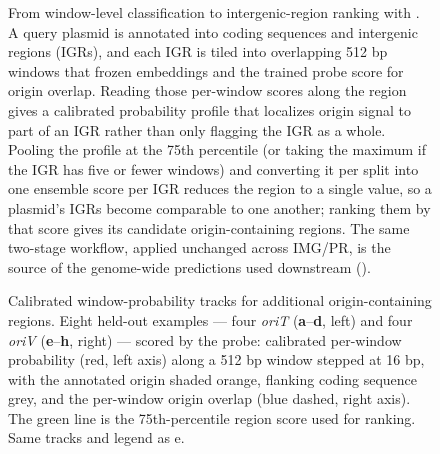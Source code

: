 %
\begin{figure}[h]
    \centering
\caption{
From window-level classification to intergenic-region ranking with \model. A query plasmid is annotated into coding sequences and intergenic regions (IGRs), and each IGR is tiled into overlapping 512 bp windows that frozen \model embeddings and the trained probe score for origin overlap. Reading those per-window scores along the region gives a calibrated probability profile that localizes origin signal to part of an IGR rather than only flagging the IGR as a whole. Pooling the profile at the 75th percentile (or taking the maximum if the IGR has five or fewer windows) and converting it per split into one ensemble score per IGR reduces the region to a single value, so a plasmid's IGRs become comparable to one another; ranking them by that score gives its candidate origin-containing regions. The same two-stage workflow, applied unchanged across IMG/PR, is the source of the genome-wide predictions used downstream ().
}
\label{fig:ed-pipeline}
\end{figure}

\begin{figure}[h]
    \centering
\caption{
Calibrated window-probability tracks for additional origin-containing regions. Eight held-out examples --- four \emph{oriT} (\textbf{a}--\textbf{d}, left) and four \emph{oriV} (\textbf{e}--\textbf{h}, right) --- scored by the \model probe: calibrated per-window probability (red, left axis) along a 512 bp window stepped at 16 bp, with the annotated origin shaded orange, flanking coding sequence grey, and the per-window origin overlap (blue dashed, right axis). The green line is the 75th-percentile region score used for ranking. Same tracks and legend as e.
}
\label{fig:ed-tracks8}
\end{figure}

